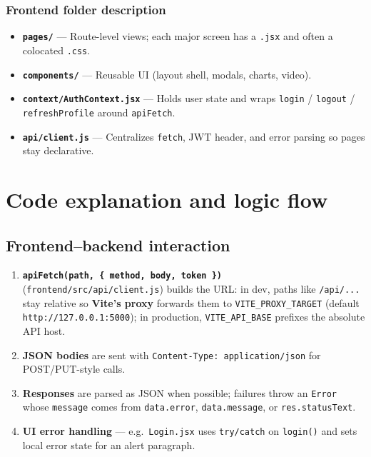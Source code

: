 \documentclass[11pt,letterpaper]{article}
\begin{document}
\subsubsection{Frontend folder description}
\begin{itemize}[nosep]
  \item \textbf{\texttt{pages/}} --- Route-level views; each major screen has a \texttt{.jsx} and often a colocated \texttt{.css}.
  \item \textbf{\texttt{components/}} --- Reusable UI (layout shell, modals, charts, video).
  \item \textbf{\texttt{context/AuthContext.jsx}} --- Holds user state and wraps \texttt{login} / \texttt{logout} / \texttt{refreshProfile} around \texttt{apiFetch}.
  \item \textbf{\texttt{api/client.js}} --- Centralizes \texttt{fetch}, JWT header, and error parsing so pages stay declarative.
\end{itemize}

\section{Code explanation and logic flow}

\subsection{Frontend--backend interaction}
\begin{enumerate}[nosep]
  \item \textbf{\texttt{apiFetch(path, \{ method, body, token \})}} (\texttt{frontend/src/api/client.js}) builds the URL: in dev, paths like \texttt{/api/...} stay relative so \textbf{Vite's proxy} forwards them to \texttt{VITE\_PROXY\_TARGET} (default \texttt{http://127.0.0.1:5000}); in production, \texttt{VITE\_API\_BASE} prefixes the absolute API host.
  \item \textbf{JSON bodies} are sent with \texttt{Content-Type: application/json} for POST/PUT-style calls.
  \item \textbf{Responses} are parsed as JSON when possible; failures throw an \texttt{Error} whose \texttt{message} comes from \texttt{data.error}, \texttt{data.message}, or \texttt{res.statusText}.
  \item \textbf{UI error handling} --- e.g.\ \texttt{Login.jsx} uses \texttt{try/catch} on \texttt{login()} and sets local error state for an alert paragraph.
\end{enumerate}
\end{document}
